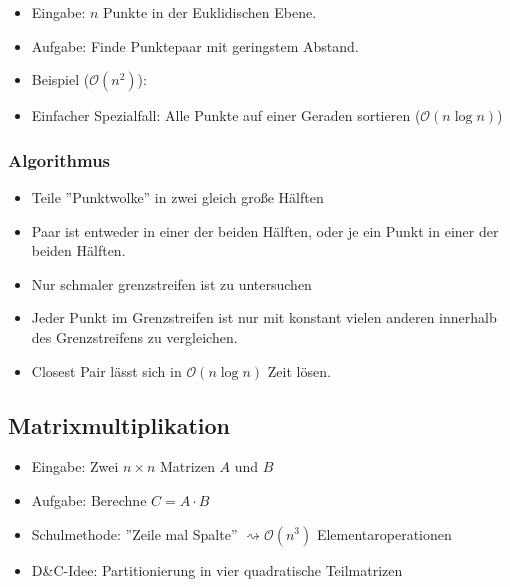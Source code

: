 \documentclass{scrartcl}
\begin{document}
\begin{itemize}
	\item Eingabe: $ n $ Punkte in der Euklidischen Ebene.
	\item Aufgabe: Finde Punktepaar mit geringstem Abstand.
	\item Beispiel ($ \mathcal{O}(n^2) $): \\
	
	\item Einfacher Spezialfall: Alle Punkte auf einer Geraden sortieren ($ \mathcal{O}(n \log n) $) \\
	
\end{itemize}

\subsubsection{Algorithmus}

\begin{itemize}
	\item Teile ''Punktwolke'' in zwei gleich große Hälften
	\item Paar ist entweder in einer der beiden Hälften, oder je ein Punkt in einer der beiden Hälften.
	\item Nur schmaler grenzstreifen ist zu untersuchen
	\item Jeder Punkt im Grenzstreifen ist nur mit konstant vielen anderen innerhalb des Grenzstreifens zu vergleichen.
	\item Closest Pair lässt sich in $ \mathcal{O}(n \log n) $ Zeit lösen.
\end{itemize}

\subsection{Matrixmultiplikation}

\begin{itemize}
	\item Eingabe: Zwei $ n \times n $ Matrizen $ A $ und $ B $
	\item Aufgabe: Berechne $ C = A \cdot B $
	\item Schulmethode: ''Zeile mal Spalte'' $ \rightsquigarrow \mathcal{O}(n^3) $ Elementaroperationen
	\item D\&C-Idee: Partitionierung in vier quadratische Teilmatrizen
\end{itemize}
\end{document}
